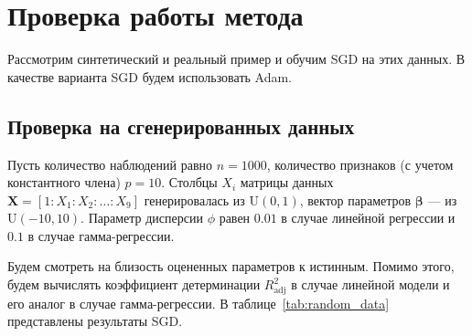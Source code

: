 \documentclass[a4paper]{article}
\begin{document}
\section{Проверка работы метода}
Рассмотрим синтетический и реальный пример и обучим SGD на этих данных. В качестве варианта SGD будем использовать Adam.
\subsection{Проверка на сгенерированных данных}
Пусть количество наблюдений равно $n=1000$, количество признаков (с учетом константного члена) $p=10$. Столбцы $X_i$ матрицы данных $\mathbf{X}=[1:X_1:X_2:\ldots:X_9]$ генерировалась из $\mathrm{U}(0, 1)$, вектор параметров $\bm\beta$ --- из $\mathrm{U}(-10, 10)$. Параметр дисперсии $\phi$ равен $0.01$ в случае линейной регрессии и $0.1$ в случае гамма-регрессии.

Будем смотреть на близость оцененных параметров к истинным. Помимо этого, будем вычислять коэффициент детерминации $R_\text{adj}^2$ в случае линейной модели и его аналог в случае гамма-регрессии. В таблице~\ref{tab:random_data} представлены результаты SGD.
\end{document}
